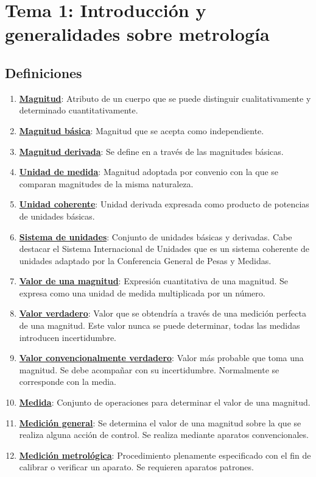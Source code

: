 
\section{Tema 1: Introducción y generalidades sobre metrología}
\subsection{Definiciones}
\begin{enumerate}
	\item \underline{\textbf{Magnitud}}: Atributo de un cuerpo que se puede distinguir cualitativamente y determinado cuantitativamente.
	\item \underline{\textbf{Magnitud básica}}: Magnitud que se acepta como independiente.
	\item \underline{\textbf{Magnitud derivada}}: Se define en a través de las magnitudes básicas.
	\item \underline{\textbf{Unidad de medida}}: Magnitud adoptada por convenio con la que se comparan magnitudes de la misma naturaleza.
	\item \underline{\textbf{Unidad coherente}}: Unidad derivada expresada como producto de potencias de unidades básicas.
	\item \underline{\textbf{Sistema de unidades}}: Conjunto de unidades básicas y derivadas. Cabe destacar el Sistema Internacional de Unidades que es un sistema coherente de unidades adaptado por la Conferencia General de Pesas y Medidas.
	\item \underline{\textbf{Valor de una magnitud}}: Expresión cuantitativa de una magnitud. Se expresa como una unidad de medida multiplicada por un número.
	\item \underline{\textbf{Valor verdadero}}: Valor que se obtendría a través de una medición perfecta de una magnitud. Este valor nunca se puede determinar, todas las medidas introducen incertidumbre.
	\item \underline{\textbf{Valor convencionalmente verdadero}}: Valor más probable que toma una magnitud. Se debe acompañar con su incertidumbre. Normalmente se corresponde con la media.
	\item \underline{\textbf{Medida}}: Conjunto de operaciones para determinar el valor de una magnitud. 
	\item \underline{\textbf{Medición general}}: Se determina el valor de una magnitud sobre la que se realiza alguna acción de control. Se realiza mediante aparatos convencionales.
	\item \underline{\textbf{Medición metrológica}}: Procedimiento plenamente especificado con el fin de calibrar o verificar un aparato. Se requieren aparatos patrones.

\end{enumerate}
